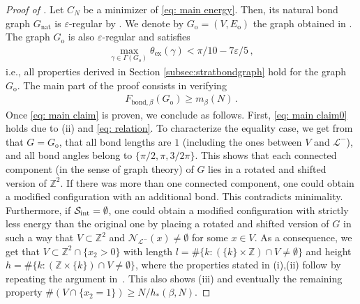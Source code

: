 \documentclass[reqno]{amsart}
\newcommand{\eps}{\varepsilon}
\theoremstyle{plain}
\theoremstyle{definition}
\numberwithin{equation}{section}
\newcommand{\Z}{\mathbb{Z}}
\begin{document}
\begin{proof}[Proof of ] Let $C_N$ be a minimizer of \eqref{eq: main energy}.  Then, its natural bond graph $G_{\mathrm{nat}}$ is $\eps$-regular by .  We denote by $G_\mathrm{o}=(V,E_\mathrm{o})$ the graph obtained in . The graph $G_\mathrm{o}$ is also $\varepsilon$-regular and satisfies  
\begin{align*}
\max_{\gamma \in \Gamma(G_o)}\theta_{\mathrm{ex}}(\gamma) < \pi/10- 7\varepsilon/5\,,  
\end{align*} 
 i.e., all properties derived in Section \ref{subsec:stratbondgraph} hold for the graph $G_\mathrm{o}$. 
 The main part of the proof consists in verifying  
\begin{align}\label{eq: main claim}
F_{\mathrm{bond},\beta}(  G_{\mathrm{o}}  ) \geq m_\beta(N)\,.
\end{align}
 Once  \eqref{eq: main claim} is proven,  we conclude as
 follows. First, \eqref{eq: main claim0} holds due to
 (ii)  and \eqref{eq: relation}. To
 characterize the equality case, we get from
  that  $G=G_\mathrm{o}$, that all bond
 lengths are $1$ (including the ones between $V$ and $\mathcal{L}^-$),
 and all bond angles belong to $\{\pi/2,\pi,3/2\pi\}$. This shows that
 each connected component (in the sense of graph theory) of $G$ lies
 in a rotated and shifted version of $\Z^2$. If there was more than
 one connected component, one could obtain a modified configuration
 with an additional bond. This contradicts minimality. Furthermore, if
 $\mathcal{S}_{\rm int} =\emptyset$, one could obtain a modified
 configuration with strictly less energy than the original one by
 placing a rotated and shifted version of $G$ in such a way  that $V
 \subset \Z^2$ and $ \mathcal{N}_{\mathcal{L}^-}(x) \neq \emptyset$
 for some $x \in V$.  As a consequence, we get that  $ V\subset \Z^2
  \cap  \lbrace x_2>0 \rbrace $  with length   $l= \#\{k\colon
 (\{k\} \times \mathbb{Z}) \cap V \neq \emptyset\}$ and height $h
 =\#\{k\colon (\mathbb{Z}\times \{k\}) \cap  V \neq \emptyset\}$, where
 the properties stated in  (i),(ii) 
  follow    by repeating the  argument  in~\cite[Proposition~6.3]{Mainini-Piovano}.  This also shows (iii)  and eventually the remaining property   
  $\#(V \cap \{x_2=1\}) \geq   N/ h_*(\beta,N) $.   





\end{proof}
\end{document}
